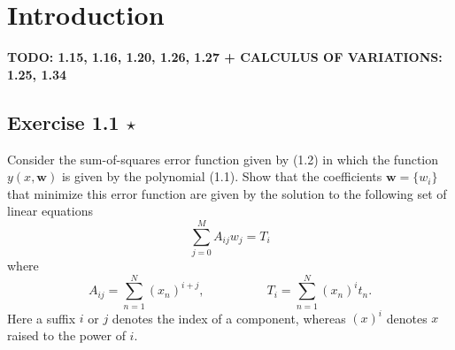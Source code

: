 \chapter{Introduction}

\textbf{TODO: 1.15, 1.16, 1.20, 1.26, 1.27 + CALCULUS OF VARIATIONS: 1.25, 1.34}

\section*{Exercise 1.1 $\star$}
Consider the sum-of-squares error function given by (1.2) in 
which the function $y(x, \mathbf{w})$ is given by the polynomial
(1.1). Show that the coefficients $\mathbf{w} = \{ w_i \}$ that minimize
this error function are given by the solution to the following
set of linear equations
\begin{equation*}
    \sum_{j=0}^{M} A_{ij}w_j = T_i
    \tag{1.122}\label{eq:1.122}
\end{equation*}
where 
\begin{equation*}
    A_{ij} = \sum_{n=1}^{N} (x_n)^{i + j}, \hspace{5em} T_i = \sum_{n=1}^{N} (x_n)^it_n.
    \tag{1.123}\label{eq:1.123}
\end{equation*}
Here a suffix $i$ or $j$ denotes the index of a component, whereas
$(x)^i$ denotes $x$ raised to the power of $i$.

\vspace{1em}

